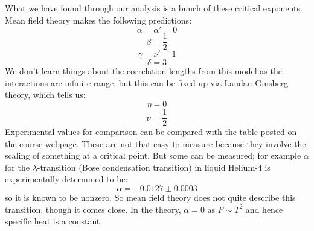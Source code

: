 What we have found through our analysis is a bunch of these critical exponents. Mean field theory makes the following predictions:
\begin{equation}
    \alpha = \alpha' = 0
\end{equation}
\begin{equation}
    \beta = \frac{1}{2}
\end{equation}
\begin{equation}
    \gamma = \nu' = 1
\end{equation}
\begin{equation}
    \delta = 3
\end{equation}
We don't learn things about the correlation lengths from this model as the interactions are infinite range; but this can be fixed up via Landau-Ginsberg theory, which tells us:
\begin{equation}
    \eta = 0
\end{equation}
\begin{equation}
    \nu = \frac{1}{2}
\end{equation}
Experimental values for comparison can be compared with the table posted on the course webpage. These are not that easy to measure because they involve the scaling of something at a critical point. But some can be measured; for example $\alpha$ for the $\lambda$-transition (Bose condensation transition) in liquid Helium-4 is experimentally determined to be:
\begin{equation}
    \alpha = -0.0127 \pm 0.0003
\end{equation}
so it is known to be nonzero. So mean field theory does not quite describe this transition, though it comes close. In the theory, $\alpha = 0$ as $F \sim T^2$ and hence specific heat is a constant.